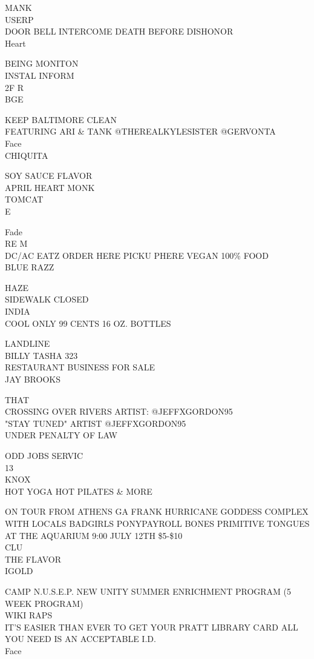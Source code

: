 \documentclass[10pt,letterpaper]{article}
\begin{document}
MANK\\
USERP\\
DOOR BELL INTERCOME DEATH BEFORE DISHONOR\\
Heart

BEING MONITON\\
INSTAL INFORM\\
2F R\\
BGE

KEEP BALTIMORE CLEAN\\
FEATURING ARI \& TANK @THEREALKYLESISTER @GERVONTA\\
Face\\
CHIQUITA

SOY SAUCE FLAVOR\\
APRIL HEART MONK\\
TOMCAT\\
E

Fade\\
RE M\\
DC/AC EATZ ORDER HERE PICKU PHERE VEGAN 100\% FOOD\\
BLUE RAZZ

HAZE\\
SIDEWALK CLOSED\\
INDIA\\
COOL ONLY 99 CENTS 16 OZ. BOTTLES

LANDLINE\\
BILLY TASHA 323\\
RESTAURANT BUSINESS FOR SALE\\
JAY BROOKS

THAT\\
CROSSING OVER RIVERS ARTIST: @JEFFXGORDON95\\
"STAY TUNED" ARTIST @JEFFXGORDON95\\
UNDER PENALTY OF LAW

ODD JOBS SERVIC\\
13\\
KNOX\\
HOT YOGA HOT PILATES \& MORE

ON TOUR FROM ATHENS GA FRANK HURRICANE GODDESS COMPLEX WITH LOCALS BADGIRLS PONYPAYROLL BONES PRIMITIVE TONGUES AT THE AQUARIUM 9:00 JULY 12TH \$5{-}\$10\\
CLU\\
THE FLAVOR\\
IGOLD

CAMP N.U.S.E.P. NEW UNITY SUMMER ENRICHMENT PROGRAM (5 WEEK PROGRAM)\\
WIKI RAPS\\
IT'S EASIER THAN EVER TO GET YOUR PRATT LIBRARY CARD ALL YOU NEED IS AN ACCEPTABLE I.D.\\
Face
\end{document}
